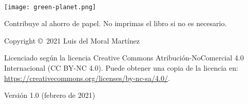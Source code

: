 \documentclass[12pt,fleqn]{book} %
\begin{document}

\begingroup
\thispagestyle{empty} %
\vfill
\endgroup


\newpage
~\vfill
\thispagestyle{empty}

\noindent \texttt{[image: green-planet.png]}

\noindent Contribuye al ahorro de papel. No imprimas el libro si no es necesario.
\newline

\noindent Copyright \copyright\ 2021 Luis del Moral Martínez
\newline

\noindent Licenciado según la licencia Creative Commons Atribución-NoComercial 4.0 Internacional (CC BY-NC 4.0). Puede obtener una copia de la licencia en:
\url{https://creativecommons.org/licenses/by-nc-sa/4.0/}.
\newline

\noindent Versión 1.0 (febrero de 2021)



\pagestyle{empty} %
\end{document}
